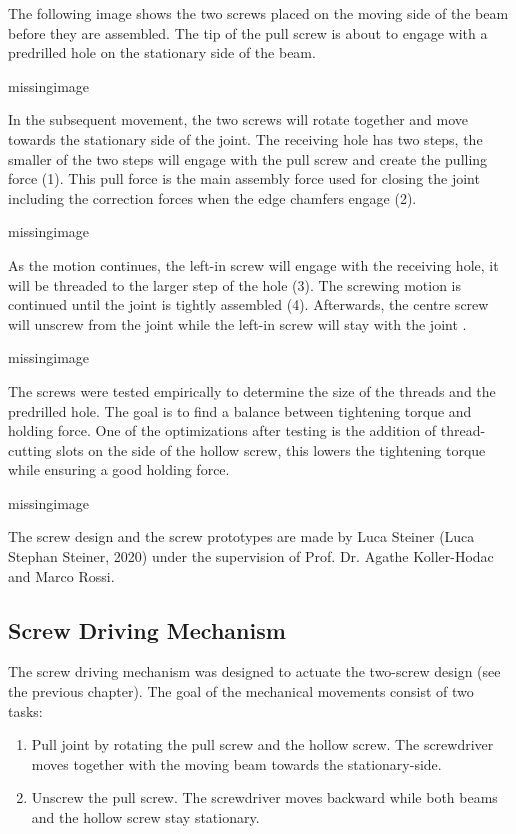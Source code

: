 The following image shows the two screws placed on the moving side of the beam before they are assembled. The tip of the pull screw is about to engage with a predrilled hole on the stationary side of the beam.

missingimage

In the subsequent movement, the two screws will rotate together and move towards the stationary side of the joint. The receiving hole has two steps, the smaller of the two steps will engage with the pull screw and create the pulling force (1). This pull force is the main assembly force used for closing the joint including the correction forces when the edge chamfers engage (2).

missingimage


As the motion continues, the left-in screw will engage with the receiving hole, it will be threaded to the larger step of the hole (3). The screwing motion is continued until the joint is tightly assembled (4). Afterwards, the centre screw will unscrew from the joint while the left-in screw will stay with the joint .

missingimage

The screws were tested empirically to determine the size of the threads and the predrilled hole. The goal is to find a balance between tightening torque and holding force. One of the optimizations after testing is the addition of thread-cutting slots on the side of the hollow screw, this lowers the tightening torque while ensuring a good holding force.

missingimage

The screw design and the screw prototypes are made by Luca Steiner (Luca Stephan Steiner, 2020) under the supervision of Prof. Dr. Agathe Koller-Hodac and Marco Rossi.

\subsection{Screw Driving Mechanism}
\label{subsection:exploration-4-screw-driving-mechanism}

The screw driving mechanism was designed to actuate the two-screw design (see the previous chapter). The goal of the mechanical movements consist of two tasks:

\begin{enumerate}
    \item Pull joint by rotating the pull screw and the hollow screw. The screwdriver moves together with the moving beam towards the stationary-side.
    \item Unscrew the pull screw. The screwdriver moves backward while both beams and the hollow screw stay stationary.
\end{enumerate}

